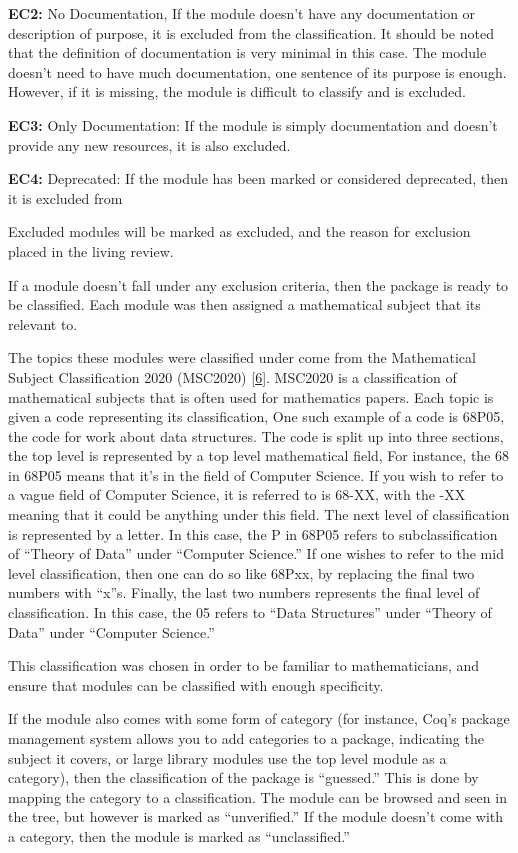 \documentclass[
]{article}
\begin{document}
\textbf{EC2:} No Documentation, If the module doesn't have any
documentation or description of purpose, it is excluded from the
classification. It should be noted that the definition of documentation
is very minimal in this case. The module doesn't need to have much
documentation, one sentence of its purpose is enough. However, if it is
missing, the module is difficult to classify and is excluded.

\textbf{EC3:} Only Documentation: If the module is simply documentation
and doesn't provide any new resources, it is also excluded.

\textbf{EC4:} Deprecated: If the module has been marked or considered
deprecated, then it is excluded from

Excluded modules will be marked as excluded, and the reason for
exclusion placed in the living review.

If a module doesn't fall under any exclusion criteria, then the package
is ready to be classified. Each module was then assigned a mathematical
subject that its relevant to.

The topics these modules were classified under come from the
Mathematical Subject Classification 2020 (MSC2020)
{[}\protect\hyperlink{ref-msc2021}{6}{]}. MSC2020 is a classification of
mathematical subjects that is often used for mathematics papers. Each
topic is given a code representing its classification, One such example
of a code is 68P05, the code for work about data structures. The code is
split up into three sections, the top level is represented by a top
level mathematical field, For instance, the 68 in 68P05 means that it's
in the field of Computer Science. If you wish to refer to a vague field
of Computer Science, it is referred to is 68-XX, with the -XX meaning
that it could be anything under this field. The next level of
classification is represented by a letter. In this case, the P in 68P05
refers to subclassification of ``Theory of Data'' under ``Computer
Science.'' If one wishes to refer to the mid level classification, then
one can do so like 68Pxx, by replacing the final two numbers with
``x''s. Finally, the last two numbers represents the final level of
classification. In this case, the 05 refers to ``Data Structures'' under
``Theory of Data'' under ``Computer Science.''

This classification was chosen in order to be familiar to
mathematicians, and ensure that modules can be classified with enough
specificity.

If the module also comes with some form of category (for instance, Coq's
package management system allows you to add categories to a package,
indicating the subject it covers, or large library modules use the top
level module as a category), then the classification of the package is
``guessed.'' This is done by mapping the category to a classification.
The module can be browsed and seen in the tree, but however is marked as
``unverified.'' If the module doesn't come with a category, then the
module is marked as ``unclassified.''
\end{document}
